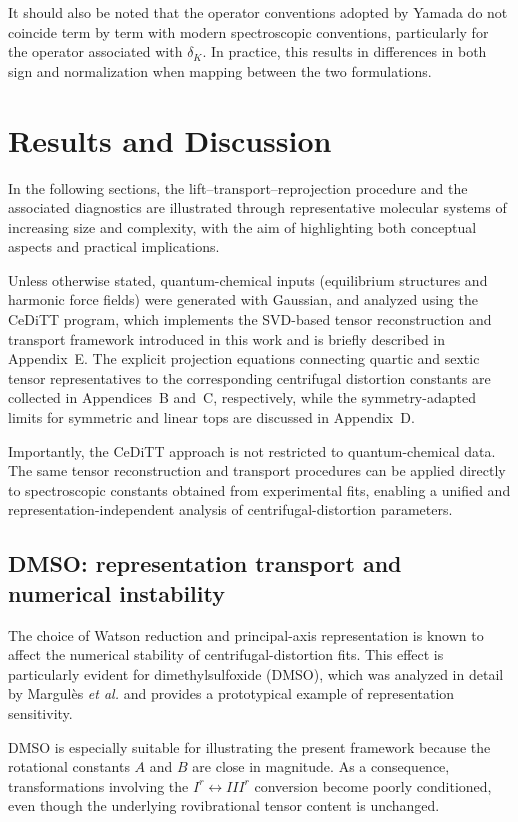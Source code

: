 \documentclass[aip,jcp,reprint,floatfix]{revtex4-2}
\begin{document}
It should also be noted that the operator conventions adopted by
Yamada do not coincide term by term with modern spectroscopic
conventions, particularly for the operator associated with $\delta_K$.
In practice, this results in differences in both sign and normalization
when mapping between the two formulations.


\section{Results and Discussion}

In the following sections, the lift--transport--reprojection procedure
and the associated diagnostics are illustrated through representative
molecular systems of increasing size and complexity, with the aim of
highlighting both conceptual aspects and practical implications.

Unless otherwise stated, quantum-chemical inputs (equilibrium
structures and harmonic force fields) were generated with
Gaussian,\cite{g16} and analyzed using the CeDiTT program, which
implements the SVD-based tensor reconstruction and transport
framework introduced in this work and is briefly described in
Appendix~E. The explicit projection equations connecting quartic and
sextic tensor representatives to the corresponding centrifugal
distortion constants are collected in Appendices~B and~C,
respectively, while the symmetry-adapted limits for symmetric and
linear tops are discussed in Appendix~D.

Importantly, the CeDiTT approach is not restricted to
quantum-chemical data. The same tensor reconstruction and transport
procedures can be applied directly to spectroscopic constants
obtained from experimental fits, enabling a unified and
representation-independent analysis of centrifugal-distortion
parameters.


\subsection{DMSO: representation transport and numerical instability}

The choice of Watson reduction and principal-axis representation is
known to affect the numerical stability of centrifugal-distortion
fits. This effect is particularly evident for dimethylsulfoxide (DMSO),
which was analyzed in detail by Margul\`es \emph{et al.}\cite{Margules2010}
and provides a prototypical example of representation sensitivity.

DMSO is especially suitable for illustrating the present framework
because the rotational constants $A$ and $B$ are close in magnitude.
As a consequence, transformations involving the
$I^r \leftrightarrow III^r$ conversion become poorly conditioned,
even though the underlying rovibrational tensor content is unchanged.
\end{document}
